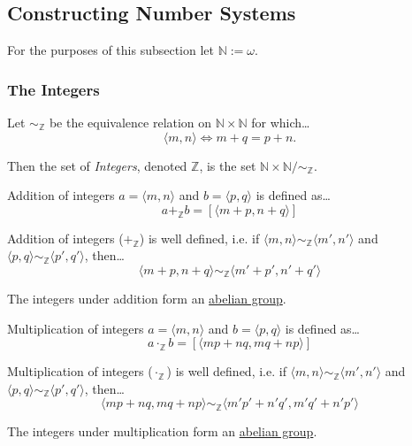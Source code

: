 \subsection{Constructing Number Systems}\label{numberconstructions}

For the purposes of this subsection let $\mathbb{N} := \omega$.

\subsubsection{The Integers}\label{integers}

Let $\sim_{\mathbb{Z}}$ be the equivalence relation on $\mathbb{N} \times \mathbb{N}$ for which\dots
$$\langle m,n \rangle \Leftrightarrow m+q=p+n.$$

\noindent Then the set of \emph{Integers}, denoted $\mathbb{Z}$, is the set $\mathbb{N} \times \mathbb{N} / \sim_{\mathbb{Z}}.$

Addition of integers $a = \langle m, n \rangle$ and $b = \langle p, q \rangle$ is defined as\dots
$$a +_{\mathbb{Z}} b = [\langle m+p, n+q \rangle]$$

\begin{lemma}
Addition of integers ($+_{\mathbb{Z}}$) is well defined, i.e. if $\langle m,n \rangle \sim_{\mathbb{Z}} \langle m',n' \rangle$ and $\langle p,q \rangle \sim_{\mathbb{Z}} \langle p',q' \rangle$, then\dots
$$\langle m + p, n + q \rangle \sim_{\mathbb{Z}} \langle m' + p', n' + q' \rangle$$
\end{lemma}

\noindent The integers under addition form an \hyperref[abeliangroupdefinition]{abelian group}.

Multiplication of integers $a = \langle m, n \rangle$ and $b = \langle p, q \rangle$ is defined as\dots
$$a \cdot_{\mathbb{Z}} b = [\langle mp + nq, mq + np \rangle]$$

\begin{lemma}
Multiplication of integers ($\cdot_{\mathbb{Z}}$) is well defined, i.e. if $\langle m,n \rangle \sim_{\mathbb{Z}} \langle m',n' \rangle$ and $\langle p,q \rangle \sim_{\mathbb{Z}} \langle p',q' \rangle$, then\dots
$$\langle mp+nq, mq+np \rangle \sim_{\mathbb{Z}} \langle m'p' + n'q', m'q' + n'p' \rangle$$
\end{lemma}

\noindent The integers under multiplication form an \hyperref[abeliangroupdefinition]{abelian group}.

